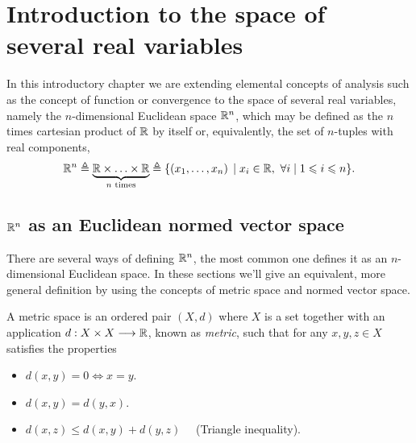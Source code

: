 \chapter[Introduction to the space of several real variables]{Introduction to the space of \\ several real variables}
\thispagestyle{noheaders}

In this introductory chapter we are extending elemental concepts of analysis such as the concept of function or 
convergence to the space of several real variables, namely the $n$-dimensional Euclidean space $\Rtn$, which may be defined 
as the $n$ times cartesian product of $\R$ by itself or, equivalently, the set of $n$-tuples with real components,
\begin{equation}
\Rtn\bydef\underbrace{\R\times\ldots\times\R}_{n\textrm{ times}} \bydef \{\left(x_1, \ldots, x_n\right)\st x_i\in\R,\ \forall i\st
1 \leq i \leq n\}.
\end{equation}

\section{$\Rtn$ as an Euclidean normed vector space}

There are several ways of defining $\Rtn$, the most common one defines it as an $n$-dimensional Euclidean space. In these 
sections we'll give an equivalent, more general definition by using the concepts of metric space and normed vector space.


\begin{defn}\label{def:metric-space}
A metric space is an ordered pair $\left(X, d\right)$ where $X$ is a set together with an application 
$\appl{d}{X\times X}{\R}$, known as \textit{metric}, such that for any $x, y, z\in X$ satisfies the properties
\begin{itemize}[itemsep = -2pt]
	\item $d(x, y) = 0\iff x = y$.
	\item $d(x, y) = d(y, x)$.
	\item $d(x, z) \leq d(x, y) + d(y, z)\quad$ (Triangle inequality).
\end{itemize}
\end{defn}

